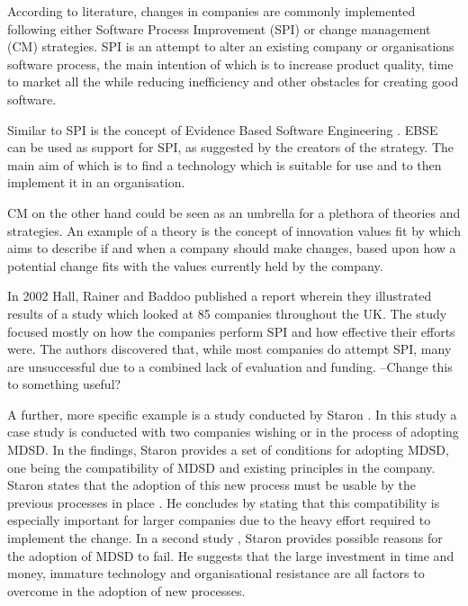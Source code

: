 \documentclass[10pt,twocolumn]{article}
\begin{document}
According to literature, changes in companies are commonly implemented following either Software Process Improvement (SPI)\cite{pettersson2008practitioner}\cite{unterkalmsteiner2012evaluation} or change management (CM) strategies. SPI is an attempt to alter an existing company or organisations software process, the main intention of which is to increase product quality, time to market all the while reducing inefficiency and other obstacles for creating good software. 

Similar to SPI is the concept of Evidence Based Software Engineering \cite{dyba2005evidence}. EBSE can be used as support for SPI, as suggested by the creators of the strategy. The main aim of which is to find a technology which is suitable for use and to then implement it in an organisation.

CM on the other hand could be seen as an umbrella for a plethora of theories and strategies. An example of a theory is the concept of innovation values fit by \cite{klein1996challenge} which aims to describe if and when a company should make changes, based upon how a potential change fits with the values currently held by the company.

In 2002 Hall, Rainer and Baddoo \cite{hall2002implementing} published a report wherein they illustrated results of a study which looked at 85 companies throughout the UK. The study focused mostly on how the companies perform SPI and how effective their efforts were. The authors discovered that, while most companies do attempt SPI, many are unsuccessful due to a combined lack of evaluation and funding. --Change this to something useful?

A further, more specific example is a study conducted by Staron \cite{staron2006adopting}. In this study a case study is conducted with two companies wishing or in the process of adopting MDSD. In the findings, Staron provides a set of conditions for adopting MDSD, one being the compatibility of MDSD and existing principles in the company. Staron states that the adoption of this new process must be usable by the previous processes in place \cite{staron2006adopting}. He concludes by stating that this compatibility is especially important for larger companies due to the heavy effort required to implement the change. In a second study \cite{staron2008transitioning}, Staron provides possible reasons for the adoption of MDSD to fail. He suggests that the large investment in time and money, immature technology and organisational resistance are all factors to overcome in the adoption of new processes.
\end{document}
